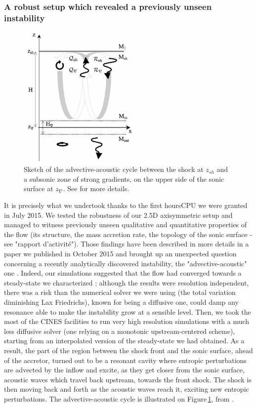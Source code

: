 \documentclass[
    a4paper, 
    12pt, onecolumn,
]{article}
\begin{document}
\subsubsection*{A robust setup which revealed a previously unseen instability}
\begin{figure}
\includegraphics[height=7cm, width=6cm]{ad_ac_cylce_sketch}
\caption{Sketch of the advective-acoustic cycle between the shock at $z_{sh}$ and a subsonic zone of strong gradients, on the upper side of the sonic surface at $z_{\nabla}$. See \cite{Foglizzo2009} for more details.}
\label{fig:cycle}
\end{figure} 
\indent \indent It is precisely what we undertook thanks to the first hoursCPU we were granted in July 2015. We tested the robustness of our 2.5D axisymmetric setup and managed to witness previously unseen qualitative and quantitative properties of the flow (its structure, the mass accretion rate, the topology of the sonic surface - see "rapport d'activit\'e"). Those findings have been described in more details in a paper we published in October 2015 \citep{ElMellah2015} and brought up an unexpected question concerning a recently analytically discovered instability, the "advective-acoustic" one \citep{Foglizzo2009}. Indeed, our simulations suggested that the flow had converged towards a steady-state we characterized ; although the results were resolution independent, there was a risk than the numerical solver we were using (the total variation diminishing Lax Friedrichs), known for being a diffusive one, could damp any resonance able to make the instability grow at a sensible level. Then, we took the most of the CINES facilities to run very high resolution simulations with a much less diffusive solver (one relying on a monotonic upstream-centered scheme), starting from an interpolated version of the steady-state we had obtained. As a result, the part of the region between the shock front and the sonic surface, ahead of the accretor, turned out to be a resonant cavity where entropic perturbations are advected by the inflow and excite, as they get closer from the sonic surface, acoustic waves which travel back upstream, towards the front shock. The shock is then moving back and forth as the acoustic waves reach it, exciting new entropic perturbations. The advective-acoustic cycle is illustrated on Figure\,\ref{fig:cycle}, from \citep{Foglizzo2009}.\\
\end{document}
